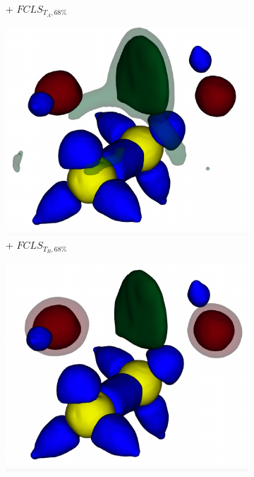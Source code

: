 \begin{figure}[!h]
\begin{subfigure}{0.16\linewidth}
\caption{+ $FCLS_{T_{A},68\%}$}
\label{fig:ethanediol_fcls_cb}
\end{subfigure}
\begin{subfigure}{0.16\linewidth}
\centering
\includegraphics[width=\linewidth]{Images/EthaneDiol/fcls_ncb_68.pdf}
\caption{+ $FCLS_{T_{B},68\%}$}
\label{fig:ethanediol_fcls_ncb}
\end{subfigure}
\begin{subfigure}{0.16\linewidth}
\centering
\includegraphics[width=\linewidth]{Images/EthaneDiol/fcls_oa_68.pdf}

\end{subfigure}
\end{figure}
